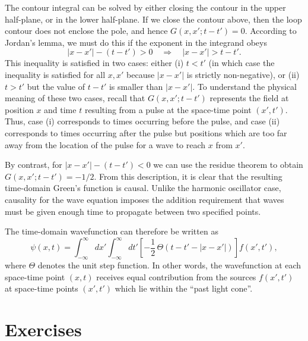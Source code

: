 \documentclass[10pt,a4paper]{article}
\begin{document}
The contour integral can be solved by either closing the contour in
the upper half-plane, or in the lower half-plane. If we close the
contour above, then the loop contour does not enclose the pole, and
hence $G(x,x';t-t') = 0$. According to Jordan's lemma, we must do this
if the exponent in the integrand obeys
\begin{equation}
  |x-x'| - (t-t') > 0  \quad \Rightarrow \quad |x-x'| > t-t'.
\end{equation}
This inequality is satisfied in two cases: either (i) $t < t'$ (in
which case the inequality is satisfied for all $x,x'$ because $|x-x'|$
is strictly non-negative), or (ii) $t > t'$ but the value of $t-t'$ is
smaller than $|x-x'|$. To understand the physical meaning of these two
cases, recall that $G(x,x';t-t')$ represents the field at position $x$
and time $t$ resulting from a pulse at the space-time point
$(x',t')$. Thus, case (i) corresponds to times occurring before the
pulse, and case (ii) corresponds to times occurring after the pulse
but positions which are too far away from the location of the pulse
for a wave to reach $x$ from $x'$.

By contrast, for $|x-x'| - (t-t') < 0$ we can use the residue theorem
to obtain $G(x,x';t-t') = -1/2$. From this description, it is clear
that the resulting time-domain Green's function is causal. Unlike the
harmonic oscillator case, causality for the wave equation imposes the
addition requirement that waves must be given enough time to propagate
between two specified points.

The time-domain wavefunction can therefore be written as
\begin{equation}
  \psi(x,t) = \int_{-\infty}^\infty dx' \int_{-\infty}^\infty dt'
  \left[-\frac{1}{2}\,\Theta(t-t' - |x-x'|)\right] f(x',t'),
\end{equation}
where $\Theta$ denotes the unit step function. In other words, the
wavefunction at each space-time point $(x,t)$ receives equal
contribution from the sources $f(x',t')$ at space-time points
$(x',t')$ which lie within the ``past light cone''.

\section{Exercises}\label{exercises}
\end{document}
